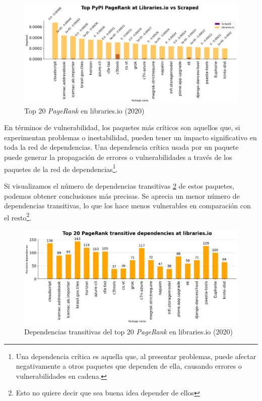 \begin{figure}[ht!]
    \begin{center}
        \includegraphics[width=1\textwidth]{img/pypi/libio_t20_pr_comparison.png}
        \caption{Top 20 \textit{PageRank} en libraries.io (2020)}
        \label{fig:Top 20 pagerank en libraries.io}
    \end{center}
\end{figure}


En términos de vulnerabilidad, los paquetes más críticos son aquellos que, si experimentan problemas o inestabilidad,
pueden tener un impacto significativo en toda la red de dependencias. Una dependencia crítica usada por un paquete
puede generar la propagación de errores o vulnerabilidades a través de los paquetes de la red de dependencias\footnote{Una dependencia crítica es aquella que, al presentar problemas, puede afectar negativamente a
    otros paquetes que dependen de ella, causando errores o vulnerabilidades en cadena.}.

Si visualizamos el número de dependencias transitivas \ref{fig:Dependencias transitivas del top 20 pagerank en libraries.io}
de estos paquetes, podemos obtener conclusiones más precisas.
Se aprecia un menor número de dependencias transitivas, lo que los hace menos vulnerables en
comparación con el resto\footnote{Esto no quiere decir que sea buena idea depender de ellos}.

\begin{figure}[ht!]
    \begin{center}
        \includegraphics[width=1\textwidth]{img/pypi/transitive libraries.png}
        \caption{Dependencias transitivas del top 20 \textit{PageRank} en libraries.io (2020)}
        \label{fig:Dependencias transitivas del top 20 pagerank en libraries.io}
    \end{center}
\end{figure}

